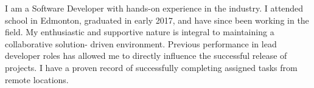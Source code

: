 I am a Software Developer with hands-on experience in the industry. I attended school in Edmonton, graduated in early 2017, and
have since been working in the field. My enthusiastic and supportive nature is integral to maintaining a collaborative solution-
driven environment. Previous performance in lead developer roles has allowed me to directly influence the successful release of
projects. I have a proven record of successfully completing assigned tasks from remote locations.